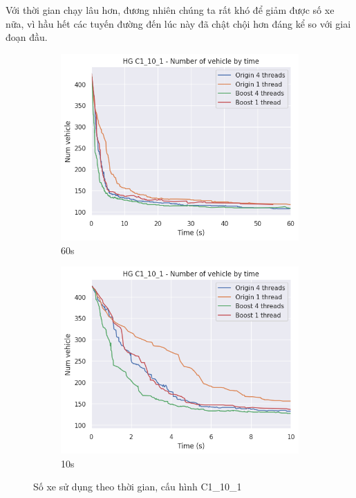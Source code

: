 Với thời gian chạy lâu hơn, đương nhiên chúng ta rất khó để giảm được số xe nữa, vì hầu hết các tuyến đường đến lúc này đã chật chội hơn đáng kể so với giai đoạn đầu.

\begin{figure}[H] %
  \label{fig:perf_ct_c1_10}
  \begin{subfigure}{.5\textwidth}
    \centering
    \includegraphics[width=1\linewidth]{figures/nv_time_60s_C1_10_1.png}
    \caption{60s}
    \label{fig:perf_ct_c1_10_60s}
  \end{subfigure}%
  \begin{subfigure}{.5\textwidth}
    \centering
    \includegraphics[width=1\linewidth]{figures/nv_time_10s_C1_10_1.png}
    \caption{10s}
    \label{fig:perf_ct_c1_10_10s}
  \end{subfigure}
  \caption{Số xe sử dụng theo thời gian, cấu hình C1\_10\_1}
\end{figure}

